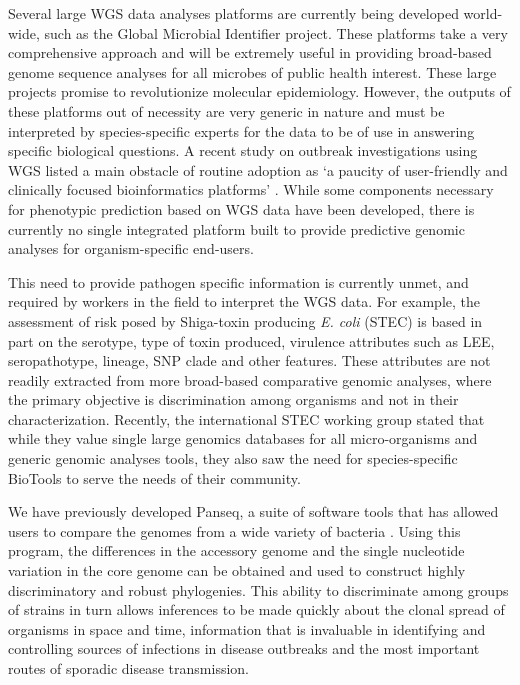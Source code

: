 \documentclass{bmcart}
\begin{document}
Several large WGS data analyses platforms are currently being developed world-wide, such as the Global Microbial Identifier project. These platforms take a very comprehensive approach and will be extremely useful in providing broad-based genome sequence analyses for all microbes of public health interest. These large projects promise to revolutionize molecular epidemiology. However, the outputs of these platforms out of necessity are very generic in nature and must be interpreted by species-specific experts for the data to be of use in answering specific biological questions. A recent study on outbreak investigations using WGS listed a main obstacle of routine adoption as `a paucity of user-friendly and clinically focused bioinformatics platforms'  \cite{sherry_outbreak_2013}. While some components necessary for phenotypic prediction based on WGS data have been developed, there is currently no single integrated platform built to provide predictive genomic analyses for organism-specific end-users.

This need to provide pathogen specific information is currently unmet, and required by workers in the field to interpret the WGS data. For example, the assessment of risk posed by Shiga-toxin producing \textit{E. coli} (STEC) is based in part on the serotype, type of toxin produced, virulence attributes such as LEE, seropathotype, lineage, SNP clade and other features. These attributes are not readily extracted from more broad-based comparative genomic analyses, where the primary objective is discrimination among organisms and not in their characterization. Recently, the international STEC working group stated that while they value single large genomics databases for all micro-organisms and generic genomic analyses tools, they also saw the need for species-specific BioTools to serve the needs of their community.

We have previously developed Panseq, a suite of software tools that has allowed users to compare the genomes from a wide variety of bacteria \cite{laing_pan-genome_2010}. Using this program, the differences in the accessory genome and the single nucleotide variation in the core genome can be obtained and used to construct highly discriminatory and robust phylogenies. This ability to discriminate among groups of strains in turn allows inferences to be made quickly about the clonal spread of organisms in space and time, information that is invaluable in identifying and controlling sources of infections in disease outbreaks and the most important routes of sporadic disease transmission. 
\end{document}
